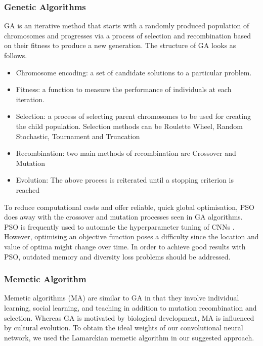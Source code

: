 \documentclass[conference]{IEEEtran}
\begin{document}
\subsubsection{Genetic Algorithms}
GA is an iterative method that starts with a randomly produced population of chromosomes and progresses via a process of selection and recombination based on their fitness to produce a new generation. The structure of GA looks as follows. 
\begin{itemize}
    \item Chromosome encoding: a set of candidate solutions to a particular problem.
    \item Fitness: a function to measure the performance of individuals at each iteration.
    \item Selection: a process of selecting parent chromosomes to be used for creating the child population. Selection methods can be Roulette Wheel, Random Stochastic, Tournament and Truncation
    \item Recombination: two main methods of recombination are Crossover and Mutation
    \item Evolution: The above process is reiterated until a stopping criterion is reached
\end{itemize}
    
To reduce computational costs and offer reliable, quick global optimisation, PSO does away with the crossover and mutation processes seen in GA algorithms.\cite{loussaief2018convolutional} PSO is frequently used to automate the hyperparameter tuning of CNNs \cite{PSO_CNN}. However, optimising an objective function poses a difficulty since the location and value of optima might change over time. In order to achieve good results with PSO, outdated memory and diversity loss problems should be addressed.
\subsubsection{Memetic Algorithm}
Memetic algorithms \cite{Moscato2003} (MA) are similar to GA in that they involve individual learning, social learning, and teaching in addition to mutation recombination and selection. Whereas GA is motivated by biological development, MA is influenced by cultural evolution. To obtain the ideal weights of our convolutional neural network, we used the Lamarckian memetic algorithm in our suggested approach.
\end{document}
